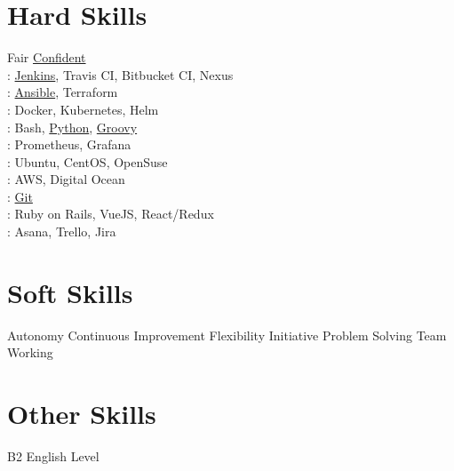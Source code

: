 \documentclass[]{deedy-resume-openfont}
\begin{document}
\begin{minipage}[t]{0.33\textwidth}
\section{Hard Skills}
Fair \textbullet{} \underline{Confident}\\
: \underline{Jenkins}, Travis CI, Bitbucket CI, Nexus\\
: \underline{Ansible}, Terraform \\
: Docker, Kubernetes, Helm \\
: Bash, \underline{Python}, \underline{Groovy} \\
: Prometheus, Grafana \\
: Ubuntu, CentOS, OpenSuse \\
: AWS, Digital Ocean \\
: \underline{Git}\\
: Ruby on Rails, VueJS, React/Redux\\
: Asana, Trello, Jira

\section{Soft Skills}
Autonomy \textbullet{} Continuous Improvement \textbullet{} Flexibility \textbullet{}
Initiative \textbullet{} Problem Solving \textbullet{} Team Working
\sectionsep
\section{Other Skills}
B2 English Level
\sectionsep

%
%

\end{minipage} 
\vline
\hspace{0.01\textwidth}
\end{document}
